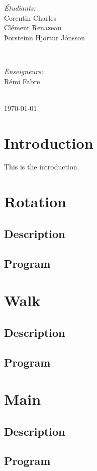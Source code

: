 \documentclass[11pt, a4paper]{article}
\begin{document}
\begin{titlepage}
\begin{minipage}{0.4\textwidth} %
\begin{flushleft} \large %
\emph{Étudiants:}
\\
Corentin Charles
\\
Clément Renazeau
\\
Þorsteinn Hjörtur Jónsson %
\end{flushleft}
\end{minipage}
~
\begin{minipage}{0.4\textwidth}
\begin{flushright} \large %
\vspace{-1cm}
\emph{Enseigneurs:} 
\\
Rémi Fabre
\\

\end{flushright}
\end{minipage}\\[3cm]
\nopagebreak      %
{\large \today}\\[3cm] %
\null
\end{titlepage}
\clearpage
\section{Introduction}
This is the introduction.\\
\clearpage
\section{Rotation}
\subsection{Description}
\subsection{Program}

\clearpage
\section{Walk}
\subsection{Description}
\subsection{Program}

\clearpage
\section{Main}
\subsection{Description}
\subsection{Program}

\clearpage

\vspace{1.5cm}
\end{document}
